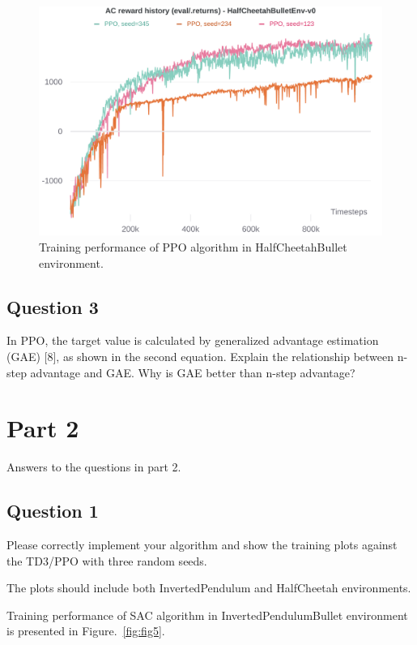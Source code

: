 \documentclass[12pt]{article}
\begin{document}
\begin{figure}[phb] 
	\centering  %
    \includegraphics[width=0.65\columnwidth]{img/Figure_4_WB_HalfCheetahBullet_PPO.png}
	\caption{Training performance of PPO algorithm in HalfCheetahBullet environment.}
	\label{fig:fig4}
\end{figure}

\pagebreak

\subsection*{Question 3}

In PPO, the target value is calculated by generalized advantage estimation (GAE) [8], 
as shown in the second equation. Explain the relationship between n-step advantage and GAE. 
Why is GAE better than n-step advantage?

\pagebreak



\section*{Part 2}

Answers to the questions in part 2.
\newline

\subsection*{Question 1}

\noindent
Please correctly implement your algorithm and show the training plots against the TD3/PPO
with three random seeds. 
\newline

\noindent
The plots should include both InvertedPendulum and HalfCheetah environments. 
\newline


Training performance of SAC algorithm in InvertedPendulumBullet environment is presented in Figure.~\ref*{fig:fig5}.
\newline
\end{document}
